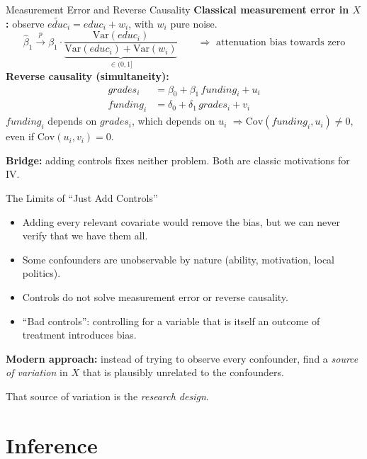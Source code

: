\documentclass[9pt,aspectratio=169]{beamer}
\newcommand{\Var}{\mathrm{Var}}
\newcommand{\Cov}{\mathrm{Cov}}
\begin{document}
\begin{frame}{Measurement Error and Reverse Causality}
\linespread{1.2}\selectfont
  \textbf{Classical measurement error in $X$:} observe $\widetilde{educ}_i = educ_i + w_i$, with $w_i$ pure noise.
  \[
    \hat\beta_1 \xrightarrow{p} \beta_1\cdot\underbrace{\frac{\Var(educ_i)}{\Var(educ_i)+\Var(w_i)}}_{\in(0,1]}
    \qquad\Rightarrow\text{ attenuation bias towards zero}
  \]
  \textbf{Reverse causality (simultaneity):}
  \begin{align*}
    grades_i  &= \beta_0 + \beta_1\,funding_i + u_i\\
    funding_i &= \delta_0 + \delta_1\,grades_i + v_i
  \end{align*}
  $funding_i$ depends on $grades_i$, which depends on $u_i$ $\Rightarrow \Cov(funding_i,u_i)\neq0$, even if $\Cov(u_i,v_i)=0$.
  \medskip

  \textbf{Bridge:} adding controls fixes neither problem. Both are classic motivations for IV.
\end{frame}

\begin{frame}{The Limits of ``Just Add Controls''}
\linespread{1.2}\selectfont
  \begin{itemize}
    \item Adding every relevant covariate would remove the bias, but we can never verify that we have them all.
    \item Some confounders are unobservable by nature (ability, motivation, local politics).
    \item Controls do not solve measurement error or reverse causality.
    \item ``Bad controls'': controlling for a variable that is itself an outcome of treatment introduces bias.
  \end{itemize}
  \medskip
  \textbf{Modern approach:} instead of trying to observe every confounder, find a \emph{source of variation} in $X$ that is plausibly unrelated to the confounders.
  \medskip

  That source of variation is the \emph{research design}.
\end{frame}

\section{Inference}
\end{document}

